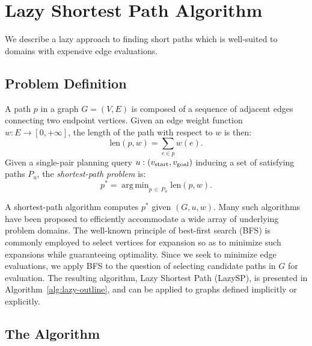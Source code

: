 \documentclass[nobib]{tufte-book}
\newcommand{\ms}[1]{\mbox{\scriptsize #1}}
\DeclareMathOperator*{\argmin}{arg\,min}
\newcommand{\cdnote}[1]{{\xxnote{CD}{blue}{#1}}}
\newcommand{\xxnote}[3]{}
\renewcommand{\xxnote}[3]{\color{#2}{#1: #3}}
\begin{document}
\section{Lazy Shortest Path Algorithm}

We describe a lazy approach to finding short paths
which is well-suited to domains with
expensive edge evaluations.

\subsection{Problem Definition}

A path $p$ in a graph $G = (V,E)$
is composed of a sequence of adjacent edges 
connecting two endpoint vertices.
Given an edge weight function
$w : E \rightarrow [0,+\infty]$,
the length of the path with respect to $w$ is then:
\begin{equation}
   \mbox{len}(p, w) = \sum_{e \in p} w(e).
\end{equation}
Given a single-pair planning query
$u: (v_{\ms{start}}, v_{\ms{goal}})$
inducing a set of satisfying paths $P_u$,
the \emph{shortest-path problem} is:
\begin{equation}
   p^* = \argmin_{p \, \in \, P_u} \mbox{len}(p, w).
   \label{eqn:objective}
\end{equation}

A shortest-path algorithm computes $p^*$
given $(G, u, w)$.
Many such algorithms have been proposed
to efficiently accommodate a wide array of underlying problem domains.
The well-known principle of best-first search (BFS)
is commonly employed to select vertices for expansion
so as to minimize such expansions while guaranteeing optimality.
Since we seek to minimize edge evaluations,
we apply BFS to the question of selecting candidate paths in
$G$ for evaluation.
The resulting algorithm, Lazy Shortest Path (LazySP),
is presented in Algorithm~\ref{alg:lazy-outline},
and can be applied to graphs defined implicitly or explicitly.


\subsection{The Algorithm}
\end{document}
